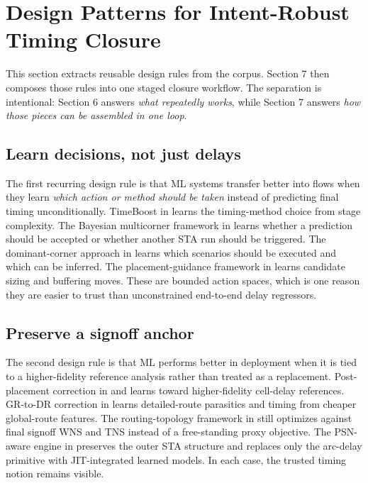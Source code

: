 \documentclass[num-refs]{wiley-article}
\begin{document}
  \section{Design Patterns for Intent-Robust Timing Closure}

  This section extracts reusable design rules from the corpus. Section 7 then composes those rules into one staged closure workflow. The separation is intentional: Section 6 answers \emph{what repeatedly works}, while Section 7 answers \emph{how those pieces can be assembled in one loop}.


  \subsection{Learn decisions, not just delays}

  The first recurring design rule is that ML systems transfer better into flows when they learn \emph{which action or method should be taken} instead of predicting final timing unconditionally. TimeBoost in \cite{ref9} learns the timing-method choice from stage complexity. The Bayesian multicorner framework in \cite{ref16} learns whether a prediction should be accepted or whether another STA run should be triggered. The dominant-corner approach in \cite{ref28} learns which scenarios should be executed and which can be inferred. The placement-guidance framework in \cite{ref1} learns candidate sizing and buffering moves. These are bounded action spaces, which is one reason they are easier to trust than unconstrained end-to-end delay regressors.


  \subsection{Preserve a signoff anchor}

  The second design rule is that ML performs better in deployment when it is tied to a higher-fidelity reference analysis rather than treated as a replacement. Post-placement correction in \cite{ref25} and \cite{ref13} learns toward higher-fidelity cell-delay references. GR-to-DR correction in \cite{ref10} learns detailed-route parasitics and timing from cheaper global-route features. The routing-topology framework in \cite{ref7} still optimizes against final signoff WNS and TNS instead of a free-standing proxy objective. The PSN-aware engine in \cite{ref12} preserves the outer STA structure and replaces only the arc-delay primitive with JIT-integrated learned models. In each case, the trusted timing notion remains visible.
\end{document}
